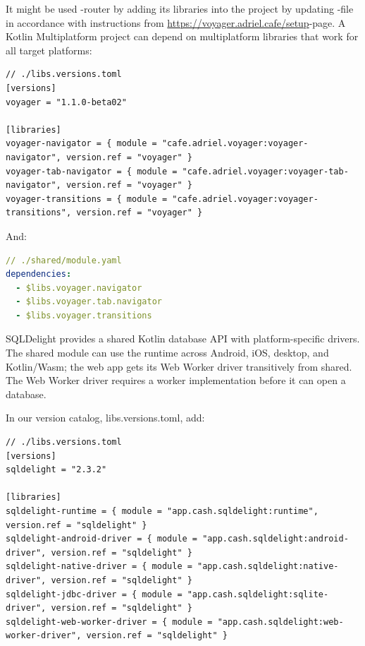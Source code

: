 It might be used -router by adding its libraries into the project by updating 
-file in accordance with instructions from 
\href{https://voyager.adriel.cafe/setup}{https://voyager.adriel.cafe/setup}-page.
A Kotlin Multiplatform project can depend on multiplatform libraries that work for all target platforms:

\begin{lstlisting}
// ./libs.versions.toml
[versions]
voyager = "1.1.0-beta02"

[libraries]
voyager-navigator = { module = "cafe.adriel.voyager:voyager-navigator", version.ref = "voyager" }
voyager-tab-navigator = { module = "cafe.adriel.voyager:voyager-tab-navigator", version.ref = "voyager" }
voyager-transitions = { module = "cafe.adriel.voyager:voyager-transitions", version.ref = "voyager" }
\end{lstlisting}

\noindent And:

\begin{lstlisting}[language=yaml]
// ./shared/module.yaml
dependencies:
  - $libs.voyager.navigator
  - $libs.voyager.tab.navigator
  - $libs.voyager.transitions
\end{lstlisting}


\noindent SQLDelight provides a shared Kotlin database API with platform-specific drivers.
The shared module can use the runtime across Android, iOS, desktop, and Kotlin/Wasm; the web app
gets its Web Worker driver transitively from shared. The Web Worker driver requires a worker
implementation before it can open a database.
 
In our version catalog, libs.versions.toml, add:

\begin{lstlisting}
// ./libs.versions.toml
[versions]
sqldelight = "2.3.2"

[libraries]
sqldelight-runtime = { module = "app.cash.sqldelight:runtime", version.ref = "sqldelight" }
sqldelight-android-driver = { module = "app.cash.sqldelight:android-driver", version.ref = "sqldelight" }
sqldelight-native-driver = { module = "app.cash.sqldelight:native-driver", version.ref = "sqldelight" }
sqldelight-jdbc-driver = { module = "app.cash.sqldelight:sqlite-driver", version.ref = "sqldelight" }
sqldelight-web-worker-driver = { module = "app.cash.sqldelight:web-worker-driver", version.ref = "sqldelight" }
\end{lstlisting}

